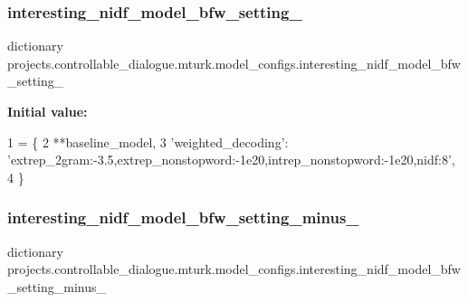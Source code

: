\subsubsection{\texorpdfstring{interesting\+\_\+nidf\+\_\+model\+\_\+bfw\+\_\+setting\+\_}{interesting\_nidf\_model\_bfw\_setting\_08}}
{\footnotesize\ttfamily dictionary projects.\+controllable\+\_\+dialogue.\+mturk.\+model\+\_\+configs.\+interesting\+\_\+nidf\+\_\+model\+\_\+bfw\+\_\+setting\+\_}

{\bfseries Initial value\+:}
\begin{DoxyCode}
1 =  \{
2     **baseline\_model,
3     \textcolor{stringliteral}{'weighted\_decoding'}: \textcolor{stringliteral}{'extrep\_2gram:-3.5,extrep\_nonstopword:-1e20,intrep\_nonstopword:-1e20,nidf:8'},
4 \}
\end{DoxyCode}
\mbox{\label{namespaceprojects_1_1controllable__dialogue_1_1mturk_1_1model__configs_a02a1f3233e294e16d9d5153acb1234cd}} 
\subsubsection{\texorpdfstring{interesting\+\_\+nidf\+\_\+model\+\_\+bfw\+\_\+setting\+\_\+minus\+\_}{interesting\_nidf\_model\_bfw\_setting\_minus\_04}}
{\footnotesize\ttfamily dictionary projects.\+controllable\+\_\+dialogue.\+mturk.\+model\+\_\+configs.\+interesting\+\_\+nidf\+\_\+model\+\_\+bfw\+\_\+setting\+\_\+minus\+\_}

